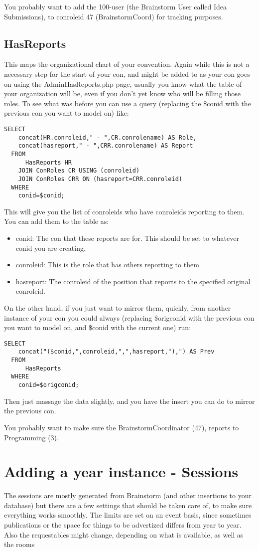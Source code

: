 \documentclass[captions=tablesignature]{scrartcl}
\begin{document}
You probably want to add the 100-user (the Brainstorm User called
Idea Submissions), to conroleid 47 (BrainstormCoord) for tracking
purposes.

\subsection{HasReports}
\label{sec-12-3}
This maps the organizational chart of your convention.  Again while
this is not a necessary step for the start of your con, and might
be added to as your con goes on using the AdminHasReports.php page,
usually you know what the table of your organization will be, even
if you don't yet know who will be filling those roles.  To see what
was before you can use a query (replacing the \$conid with the
previous con you want to model on) like:
\begin{verbatim}
SELECT
    concat(HR.conroleid," - ",CR.conrolename) AS Role,
    concat(hasreport," - ",CRR.conrolename) AS Report
  FROM
      HasReports HR
    JOIN ConRoles CR USING (conroleid)
    JOIN ConRoles CRR ON (hasreport=CRR.conroleid)
  WHERE
    conid=$conid;
\end{verbatim}
This will give you the list of conroleids who have conroleids
reporting to them.  You can add them to the table as:
\begin{itemize}
\item conid: The con that these reports are for.  This should be set
to whatever conid you are creating.
\item conroleid: This is the role that has others reporting to them
\item hasreport: The conroleid of the position that reports to the
specified original conroleid.
\end{itemize}

On the other hand, if you just want to mirror them, quickly, from
another instance of your con you could always (replacing \$origconid
with the previous con you want to model on, and \$conid with the
current one) run:
\begin{verbatim}
SELECT
    concat("($conid,",conroleid,",",hasreport,"),") AS Prev
  FROM
      HasReports
  WHERE
    conid=$origconid;
\end{verbatim}
Then just massage the data slightly, and you have the insert you
can do to mirror the previous con.

You probably want to make sure the BrainstormCoordinator (47),
reports to Programming (3).

\section{Adding a year instance - Sessions}
\label{sec-13}
The sessions are mostly generated from Brainstorm (and other
insertions to your database) but there are a few settings that
should be taken care of, to make sure everything works smoothly.
The limits are set on an event basis, since sometimes publications
or the space for things to be advertized differs from year to year.
Also the requestables might change, depending on what is available,
as well as the rooms
\end{document}

